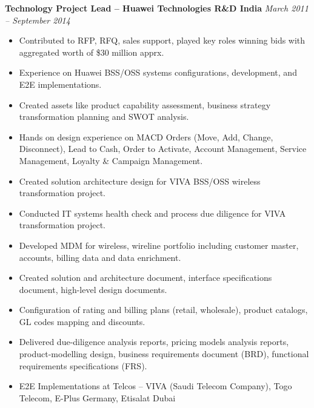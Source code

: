 \documentclass[line, margin]{res}
\begin{document}
\begin{resume}
	{\bf Technology Project Lead \-– Huawei Technologies R\&D India}  \hspace{5ex} {\em March 2011 – September 2014}\\
	\begin{itemize}
		\item Contributed to RFP, RFQ, sales support, played key roles winning bids with aggregated worth of \$30 million apprx.
		\item Experience on Huawei BSS/OSS systems configurations, development, and E2E implementations.
		\item Created assets like product capability assessment, business strategy transformation planning and SWOT analysis.
		\item Hands on design experience on MACD Orders (Move, Add, Change, Disconnect), Lead to Cash, Order to Activate, Account Management, Service Management, Loyalty \& Campaign Management.
		\item Created solution architecture design for VIVA BSS/OSS wireless transformation project.
		\item Conducted IT systems health check and process due diligence for VIVA transformation project. 
		\item Developed MDM for wireless, wireline portfolio including customer master, accounts, billing data and data enrichment.
		\item Created solution and architecture document, interface specifications document, high-level design documents.
		\item Configuration of rating and billing plans (retail, wholesale), product catalogs, GL codes mapping and discounts.
		\item Delivered due-diligence analysis reports, pricing models analysis reports, product-modelling design, business requirements document (BRD), functional requirements specifications (FRS).
		\item E2E Implementations at Telcos – VIVA (Saudi Telecom Company), Togo Telecom, E-Plus Germany, Etisalat Dubai
		\end{itemize}

		
\end{resume}
\end{document}

